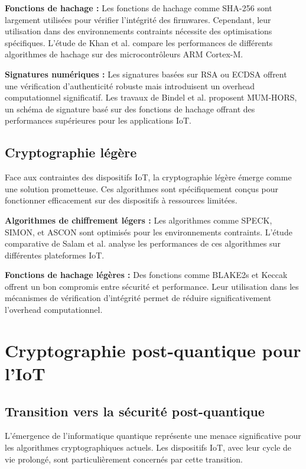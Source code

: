 \textbf{Fonctions de hachage :} Les fonctions de hachage comme SHA-256 sont largement utilisées pour vérifier l'intégrité des firmwares. Cependant, leur utilisation dans des environnements contraints nécessite des optimisations spécifiques. L'étude de Khan et al. \cite{Khan2024EfficiencySecurity} compare les performances de différents algorithmes de hachage sur des microcontrôleurs ARM Cortex-M.

\textbf{Signatures numériques :} Les signatures basées sur RSA ou ECDSA offrent une vérification d'authenticité robuste mais introduisent un overhead computationnel significatif. Les travaux de Bindel et al. \cite{Bindel2024MUMHors} proposent MUM-HORS, un schéma de signature basé sur des fonctions de hachage offrant des performances supérieures pour les applications IoT.

\subsection{Cryptographie légère}

Face aux contraintes des dispositifs IoT, la cryptographie légère émerge comme une solution prometteuse. Ces algorithmes sont spécifiquement conçus pour fonctionner efficacement sur des dispositifs à ressources limitées.

\textbf{Algorithmes de chiffrement légers :} Les algorithmes comme SPECK, SIMON, et ASCON sont optimisés pour les environnements contraints. L'étude comparative de Salam et al. \cite{Salam2024SurveyLightweight} analyse les performances de ces algorithmes sur différentes plateformes IoT.

\textbf{Fonctions de hachage légères :} Des fonctions comme BLAKE2s et Keccak offrent un bon compromis entre sécurité et performance. Leur utilisation dans les mécanismes de vérification d'intégrité permet de réduire significativement l'overhead computationnel.

\section{Cryptographie post-quantique pour l'IoT}

\subsection{Transition vers la sécurité post-quantique}

L'émergence de l'informatique quantique représente une menace significative pour les algorithmes cryptographiques actuels. Les dispositifs IoT, avec leur cycle de vie prolongé, sont particulièrement concernés par cette transition.

